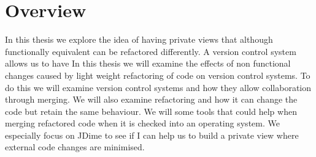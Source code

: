% 
 

\section{Overview}
In this thesis we explore the idea of having private views that although functionally equivalent can be refactored differently.
A version control system allows us to have 
In this thesis we will examine the effects of non functional changes caused by light weight refactoring of code on version control systems.
To do this we will examine version control systems and how they allow collaboration through merging.
We will also examine refactoring and how it can change the code but retain the same behaviour.
We will some tools that could help when merging refactored code when it is checked into an operating system. 
We especially focus on JDime to see if I can help us to build a private view where external code changes are minimised.
 
